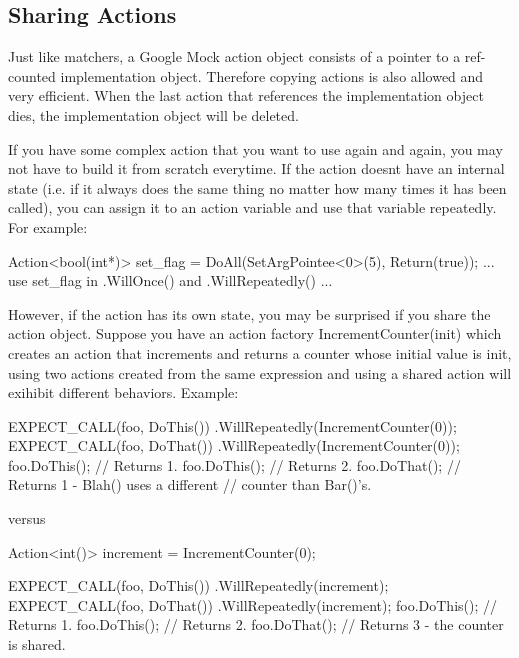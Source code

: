 \subsection*{Sharing Actions}

Just like matchers, a Google Mock action object consists of a pointer to a ref-\/counted implementation object. Therefore copying actions is also allowed and very efficient. When the last action that references the implementation object dies, the implementation object will be deleted.

If you have some complex action that you want to use again and again, you may not have to build it from scratch everytime. If the action doesn\textquotesingle{}t have an internal state (i.\+e. if it always does the same thing no matter how many times it has been called), you can assign it to an action variable and use that variable repeatedly. For example\+:


\begin{DoxyCode}
Action<bool(int*)> set\_flag = DoAll(SetArgPointee<0>(5),
                                    Return(true));
... use set\_flag in .WillOnce() and .WillRepeatedly() ...
\end{DoxyCode}


However, if the action has its own state, you may be surprised if you share the action object. Suppose you have an action factory {\ttfamily Increment\+Counter(init)} which creates an action that increments and returns a counter whose initial value is {\ttfamily init}, using two actions created from the same expression and using a shared action will exihibit different behaviors. Example\+:


\begin{DoxyCode}
EXPECT\_CALL(foo, DoThis())
    .WillRepeatedly(IncrementCounter(0));
EXPECT\_CALL(foo, DoThat())
    .WillRepeatedly(IncrementCounter(0));
foo.DoThis();  // Returns 1.
foo.DoThis();  // Returns 2.
foo.DoThat();  // Returns 1 - Blah() uses a different
               // counter than Bar()'s.
\end{DoxyCode}


versus


\begin{DoxyCode}
Action<int()> increment = IncrementCounter(0);

EXPECT\_CALL(foo, DoThis())
    .WillRepeatedly(increment);
EXPECT\_CALL(foo, DoThat())
    .WillRepeatedly(increment);
foo.DoThis();  // Returns 1.
foo.DoThis();  // Returns 2.
foo.DoThat();  // Returns 3 - the counter is shared.
\end{DoxyCode}


